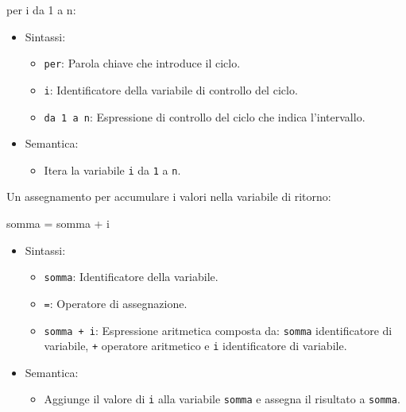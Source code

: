 \documentclass[
  letterpaper,
]{scrbook}
\newenvironment{Shaded}{\begin{snugshade}}{\end{snugshade}}
\newcommand{\NormalTok}[1]{\textcolor[rgb]{0.00,0.23,0.31}{#1}}
\providecommand{\tightlist}{%
  \setlength{\itemsep}{0pt}\setlength{\parskip}{0pt}}\usepackage{longtable,booktabs,array}
\begin{document}
\begin{Shaded}
\begin{Highlighting}[]
\NormalTok{per i da 1 a n:}
\end{Highlighting}
\end{Shaded}

\begin{itemize}
\tightlist
\item
  Sintassi:

  \begin{itemize}
  \tightlist
  \item
    \texttt{per}: Parola chiave che introduce il ciclo.
  \item
    \texttt{i}: Identificatore della variabile di controllo del ciclo.
  \item
    \texttt{da\ 1\ a\ n}: Espressione di controllo del ciclo che indica
    l'intervallo.
  \end{itemize}
\item
  Semantica:

  \begin{itemize}
  \tightlist
  \item
    Itera la variabile \texttt{i} da \texttt{1} a \texttt{n}.
  \end{itemize}
\end{itemize}

Un assegnamento per accumulare i valori nella variabile di ritorno:

\begin{Shaded}
\begin{Highlighting}[]
\NormalTok{somma = somma + i}
\end{Highlighting}
\end{Shaded}

\begin{itemize}
\tightlist
\item
  Sintassi:

  \begin{itemize}
  \tightlist
  \item
    \texttt{somma}: Identificatore della variabile.
  \item
    \texttt{=}: Operatore di assegnazione.
  \item
    \texttt{somma\ +\ i}: Espressione aritmetica composta da:
    \texttt{somma} identificatore di variabile, \texttt{+} operatore
    aritmetico e \texttt{i} identificatore di variabile.
  \end{itemize}
\item
  Semantica:

  \begin{itemize}
  \tightlist
  \item
    Aggiunge il valore di \texttt{i} alla variabile \texttt{somma} e
    assegna il risultato a \texttt{somma}.
  \end{itemize}
\end{itemize}
\end{document}
